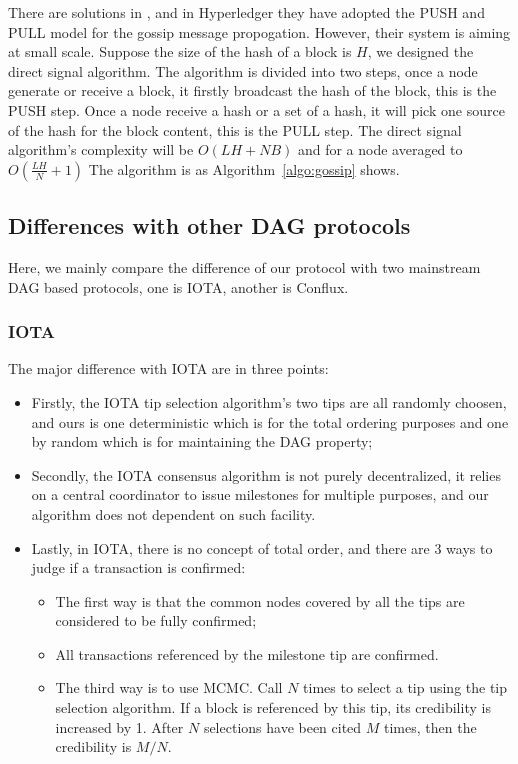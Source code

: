 There are solutions in \cite{demers1988epidemic}, and in Hyperledger \cite{androulaki2018hyperledger} 
they have adopted the PUSH and PULL model for the gossip message propogation. However, their system is aiming at small scale. 
Suppose the size of the hash of a block is $H$, we designed the direct signal algorithm. 
The algorithm is divided into two steps, once a node generate or receive a block, 
it firstly broadcast the hash of the block, this is the PUSH step. 
Once a node receive a hash or a set of a hash,
it will pick one source of the hash for the block content, this is the PULL step.
The direct signal algorithm's complexity will be $O(LH + NB)$ and for a node averaged to $O(\frac{LH}{N} + 1)$
The algorithm is as Algorithm~\ref{algo:gossip} shows.



\subsection{Differences with other DAG protocols}
Here, we mainly compare the difference of our protocol with two mainstream DAG based protocols, one is IOTA, another is Conflux.

\subsubsection{IOTA}
The major difference with IOTA are in three points:
\begin{itemize}
    \item Firstly, the IOTA tip selection algorithm's two tips are all randomly choosen, 
        and ours is one deterministic which is for the total ordering purposes and one by random which is for maintaining the DAG property; 
    \item Secondly, the IOTA consensus algorithm is not purely decentralized, 
        it relies on a central coordinator to issue milestones for multiple purposes, and our algorithm does not dependent on such facility. 
    \item Lastly, in IOTA, there is no concept of total order,
        and there are 3 ways to judge if a transaction is confirmed: 
    \begin{itemize}
        \item The first way is that the common nodes covered by all the tips are considered to be fully confirmed; 
        \item All transactions referenced by the milestone tip are confirmed.
        \item The third way is to use MCMC.
            Call $N$ times to select a tip using the tip selection algorithm.
            If a block is referenced by this tip, its credibility is increased by 1.
            After $N$ selections have been cited $M$ times, then the credibility is $M / N$.
    \end{itemize}
\end{itemize}

